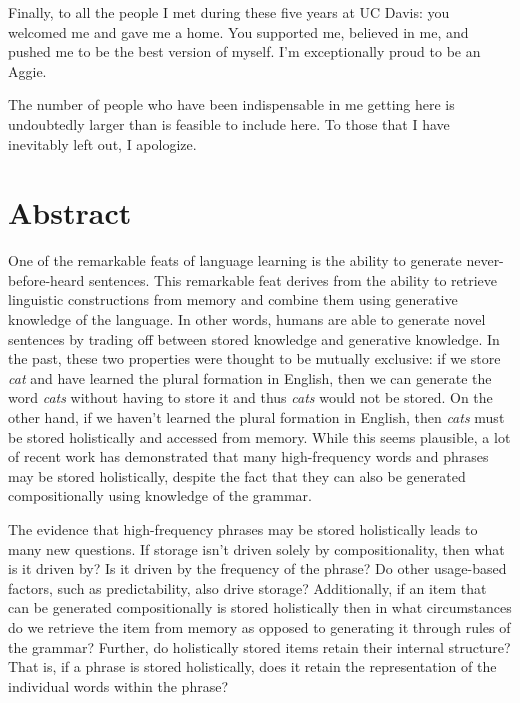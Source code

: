 \documentclass[
  12pt,
  letterpaper,
]{scrreport}
\begin{document}
Finally, to all the people I met during these five years at UC Davis:
you welcomed me and gave me a home. You supported me, believed in me,
and pushed me to be the best version of myself. I'm exceptionally proud
to be an Aggie.

The number of people who have been indispensable in me getting here is
undoubtedly larger than is feasible to include here. To those that I
have inevitably left out, I apologize.

\doublespacing

\setlength{\parindent}{4em}


\chapter*{Abstract}\label{sec-abstract}


One of the remarkable feats of language learning is the ability to
generate never-before-heard sentences. This remarkable feat derives from
the ability to retrieve linguistic constructions from memory and combine
them using generative knowledge of the language. In other words, humans
are able to generate novel sentences by trading off between stored
knowledge and generative knowledge. In the past, these two properties
were thought to be mutually exclusive: if we store \emph{cat} and have
learned the plural formation in English, then we can generate the word
\emph{cats} without having to store it and thus \emph{cats} would not be
stored. On the other hand, if we haven't learned the plural formation in
English, then \emph{cats} must be stored holistically and accessed from
memory. While this seems plausible, a lot of recent work has
demonstrated that many high-frequency words and phrases may be stored
holistically, despite the fact that they can also be generated
compositionally using knowledge of the grammar.

The evidence that high-frequency phrases may be stored holistically
leads to many new questions. If storage isn't driven solely by
compositionality, then what is it driven by? Is it driven by the
frequency of the phrase? Do other usage-based factors, such as
predictability, also drive storage? Additionally, if an item that can be
generated compositionally is stored holistically then in what
circumstances do we retrieve the item from memory as opposed to
generating it through rules of the grammar? Further, do holistically
stored items retain their internal structure? That is, if a phrase is
stored holistically, does it retain the representation of the individual
words within the phrase?
\end{document}

